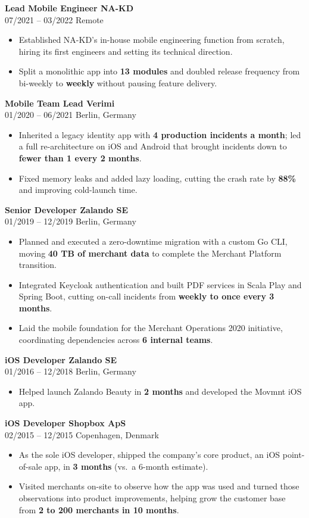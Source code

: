 \documentclass[10pt,a4paper]{article}
\newcommand{\expitem}[4]{%
  \vspace{2pt}%
  {\normalsize\bfseries\color{darktext}#1 \textbullet{} \color{accent}#2}\\[1pt]%
  {\small\color{muted}#3 \textbullet{} #4}%
  \par\vspace{3pt}%
}
\begin{document}
\expitem{Lead Mobile Engineer}{NA-KD}{07/2021 -- 03/2022}{Remote}
\begin{itemize}
  \item Established NA-KD's in-house mobile engineering function from scratch, hiring its first engineers and setting its technical direction.
  \item Split a monolithic app into \textbf{13 modules} and doubled release frequency from bi-weekly to \textbf{weekly} without pausing feature delivery.
\end{itemize}

\expitem{Mobile Team Lead}{Verimi}{01/2020 -- 06/2021}{Berlin, Germany}
\begin{itemize}
  \item Inherited a legacy identity app with \textbf{4 production incidents a month}; led a full re-architecture on iOS and Android that brought incidents down to \textbf{fewer than 1 every 2 months}.
  \item Fixed memory leaks and added lazy loading, cutting the crash rate by \textbf{88\%} and improving cold-launch time.
\end{itemize}

\expitem{Senior Developer}{Zalando SE}{01/2019 -- 12/2019}{Berlin, Germany}
\begin{itemize}
  \item Planned and executed a zero-downtime migration with a custom Go CLI, moving \textbf{40 TB of merchant data} to complete the Merchant Platform transition.
  \item Integrated Keycloak authentication and built PDF services in Scala Play and Spring Boot, cutting on-call incidents from \textbf{weekly to once every 3 months}.
  \item Laid the mobile foundation for the Merchant Operations 2020 initiative, coordinating dependencies across \textbf{6 internal teams}.
\end{itemize}

\expitem{iOS Developer}{Zalando SE}{01/2016 -- 12/2018}{Berlin, Germany}
\begin{itemize}
  \item Helped launch Zalando Beauty in \textbf{2 months} and developed the Movmnt iOS app.
\end{itemize}

\expitem{iOS Developer}{Shopbox ApS}{02/2015 -- 12/2015}{Copenhagen, Denmark}
\begin{itemize}
  \item As the sole iOS developer, shipped the company's core product, an iOS point-of-sale app, in \textbf{3 months} (vs.\ a 6-month estimate).
  \item Visited merchants on-site to observe how the app was used and turned those observations into product improvements, helping grow the customer base from \textbf{2 to 200 merchants in 10 months}.
\end{itemize}
\end{document}
